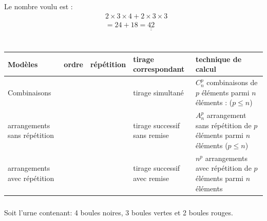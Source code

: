 \documentclass[12pt,a4paper]{article}
\newcommand{\coche}{{\color{red}\ding{51}}}
\newcommand{\croix}{{\color{red}\ding{55}}}
\begin{document}
\vspace{2em}

\noindent Le nombre voulu est :
\begin{align*}
    & 2 \times 3 \times 4 + 2 \times 3 \times 3 \\
    &= 24 + 18 = \underline{\underline{42}}
\end{align*}

\section*{\underline{\color{red}{III) Modèles de dénombrements :}}}

\begin{small}
\renewcommand{\arraystretch}{2.5}
\begin{tabularx}{\textwidth}{|>{\centering\arraybackslash}m{2.8cm}|>{\centering\arraybackslash}m{1.2cm}|>{\centering\arraybackslash}m{1.7cm}|>{\centering\arraybackslash}X|>{\centering\arraybackslash}X|}
\hline
\textbf{Modèles} & \textbf{ordre} & \textbf{répétition} & \textbf{tirage correspondant} & \textbf{technique de calcul} \\
\hline
\color{blue} Combinaisons & \croix & \croix & tirage simultané & {\color{red} $C_n^p$} \newline \scriptsize \color{red} combinaisons de $p$ éléments parmi $n$ éléments : ($p \leqslant n$) \\
\hline
\color{blue} arrangements sans répétition & \coche & \croix & tirage successif sans remise & {\color{red} $A_n^p$} \newline \scriptsize \color{red} arrangement sans répétition de $p$ éléments parmi $n$ éléments ($p \leqslant n$) \\
\hline
\color{blue} arrangements avec répétition & \coche & \coche & tirage successif avec remise & {\color{red} $n^p$} \newline \scriptsize \color{red} arrangements avec répétition de $p$ éléments parmi $n$ éléments \\
\hline
\end{tabularx}
\end{small}

\subsubsection*{\underline{\color{red}{Dénombrement - Applications}}}

Soit l'urne contenant: 4 boules noires, 3 boules vertes et 2 boules rouges.
\end{document}
